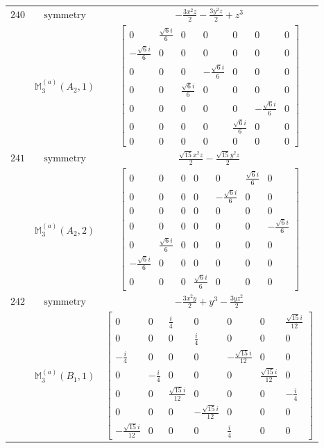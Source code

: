 \documentclass[fleqn,8pt,landscape]{jsarticle}
\begin{document}
\begin{longtable}{ccc}
$ 240 $ & $ \text{symmetry} $ & $ - \frac{3 x^{2} z}{2} - \frac{3 y^{2} z}{2} + z^{3} $ \\
$  $ & $ \mathbb{M}_{3}^{(a)}(A_{2},1) $ & $ \begin{bmatrix} 0 & \frac{\sqrt{6} i}{6} & 0 & 0 & 0 & 0 & 0 \\ - \frac{\sqrt{6} i}{6} & 0 & 0 & 0 & 0 & 0 & 0 \\ 0 & 0 & 0 & - \frac{\sqrt{6} i}{6} & 0 & 0 & 0 \\ 0 & 0 & \frac{\sqrt{6} i}{6} & 0 & 0 & 0 & 0 \\ 0 & 0 & 0 & 0 & 0 & - \frac{\sqrt{6} i}{6} & 0 \\ 0 & 0 & 0 & 0 & \frac{\sqrt{6} i}{6} & 0 & 0 \\ 0 & 0 & 0 & 0 & 0 & 0 & 0 \end{bmatrix} $ \\ \hline
$ 241 $ & $ \text{symmetry} $ & $ \frac{\sqrt{15} x^{2} z}{2} - \frac{\sqrt{15} y^{2} z}{2} $ \\
$  $ & $ \mathbb{M}_{3}^{(a)}(A_{2},2) $ & $ \begin{bmatrix} 0 & 0 & 0 & 0 & 0 & \frac{\sqrt{6} i}{6} & 0 \\ 0 & 0 & 0 & 0 & - \frac{\sqrt{6} i}{6} & 0 & 0 \\ 0 & 0 & 0 & 0 & 0 & 0 & 0 \\ 0 & 0 & 0 & 0 & 0 & 0 & - \frac{\sqrt{6} i}{6} \\ 0 & \frac{\sqrt{6} i}{6} & 0 & 0 & 0 & 0 & 0 \\ - \frac{\sqrt{6} i}{6} & 0 & 0 & 0 & 0 & 0 & 0 \\ 0 & 0 & 0 & \frac{\sqrt{6} i}{6} & 0 & 0 & 0 \end{bmatrix} $ \\ \hline
$ 242 $ & $ \text{symmetry} $ & $ - \frac{3 x^{2} y}{2} + y^{3} - \frac{3 y z^{2}}{2} $ \\
$  $ & $ \mathbb{M}_{3}^{(a)}(B_{1},1) $ & $ \begin{bmatrix} 0 & 0 & \frac{i}{4} & 0 & 0 & 0 & \frac{\sqrt{15} i}{12} \\ 0 & 0 & 0 & \frac{i}{4} & 0 & 0 & 0 \\ - \frac{i}{4} & 0 & 0 & 0 & - \frac{\sqrt{15} i}{12} & 0 & 0 \\ 0 & - \frac{i}{4} & 0 & 0 & 0 & \frac{\sqrt{15} i}{12} & 0 \\ 0 & 0 & \frac{\sqrt{15} i}{12} & 0 & 0 & 0 & - \frac{i}{4} \\ 0 & 0 & 0 & - \frac{\sqrt{15} i}{12} & 0 & 0 & 0 \\ - \frac{\sqrt{15} i}{12} & 0 & 0 & 0 & \frac{i}{4} & 0 & 0 \end{bmatrix} $ \\ \hline

\end{longtable}
\end{document}
